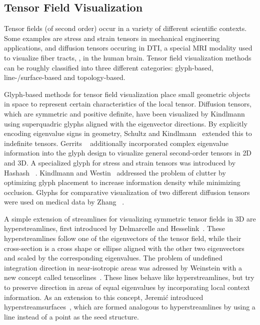 \subsection{Tensor Field Visualization} %
\label{sub:tcl_tensor_field_visualization}
%
Tensor fields (of second order) occur in a variety of different scientific
contexts.
%
Some examples are stress and strain tensors in mechanical engineering
applications, and diffusion tensors occuring in \ac{DTI}, a special \ac{MRI}
modality used to visualize fiber tracts, \eg, in the human brain.
%
Tensor field visualization methods can be roughly classified into three
different categories:
%
glyph-based, line-/surface-based and topology-based.
%

%
Glyph-based methods for tensor field visualization place small geometric objects
in space to represent certain characteristics of the local tensor.
%
Diffusion tensors, which are symmetric and positive definite, have been
visualized by Kindlmann~\cite{Kindlmann2004} using superquadric glyphs
aligned with the eigenvector directions.
%
By explicitly encoding eigenvalue signs in geometry, Schultz and
Kindlmann~\cite{Schultz2010a} extended this to indefinite tensors.
%
Gerrits \etal~\cite{Gerrits2017} additionally incorporated complex eigenvalue
information into the glyph design to visualize general second-order tensors
in \ac{2D} and \ac{3D}.
%
A specialized glyph for stress and strain tensors was introduced by Hashash
\etal~\cite{Hashash2003}.
%
Kindlmann and Westin~\cite{Kindlmann2006} addressed the problem of clutter by
optimizing glyph placement to increase information density while minimizing
occlusion.
%
Glyphs for comparative visualization of two different diffusion tensors were
used on medical data by Zhang \etal~\cite{Zhang2016}.
%

%
A simple extension of streamlines for visualizing symmetric tensor fields in \ac{3D}
are hyperstreamlines, first introduced by Delmarcelle and
Hesselink~\cite{Delmarcelle1993}.
%
These hyperstreamlines follow one of the eigenvectors of the tensor field, while
their cross-section is a cross shape or ellipse aligned with the other two
eigenvectors and scaled by the corresponding eigenvalues.
%
The problem of undefined integration direction in near-isotropic areas was
adressed by Weinstein \etal with a new concept called
tensorlines~\cite{Weinstein1999}.
%
These lines behave like hyperstreamlines, but try to preserve direction in areas
of equal eigenvalues by incorporating local context information.
%
As an extension to this concept, Jeremi{\'c} \etal introduced
hyperstreamsurfaces~\cite{Jeremic2002}, which are formed analogous to
hyperstreamlines by using a line instead of a point as the seed structure.
%

